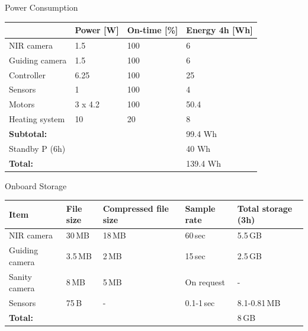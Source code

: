 \documentclass[11pt, aspectratio=169]{beamer}
\begin{document}
\begin{frame}{Power Consumption}
\centering
	\begin{tabular}{| l | l | l | l |}
	\hline
	& \textbf{Power [W]} & \textbf{On-time [\%]} & \textbf{Energy 4h [Wh]} \\\hline\hline
	NIR camera 		& 1.5	 	& 100 & 6 		\\\hline
	Guiding camera 	& 1.5 		& 100 & 6		\\\hline
	Controller 		& 6.25 		& 100 & 25		\\\hline
	Sensors 		& 1			& 100 & 4		\\\hline
	Motors			& 3 x 4.2	& 100 & 50.4	\\\hline
	Heating system 	& 10		& 20  & 8		\\\hline\hline
	
	\textbf{Subtotal:}& & 			  & 99.4 Wh \\\hline\hline
	
	Standby P (6h) 	& & 			  & 40 Wh	\\\hline\hline
	
	\textbf{Total:} & & 			  & 139.4 Wh\\\hline
	\end{tabular}
\end{frame}

\begin{frame}[c]{Onboard Storage}
\centering
\hspace*{-.5cm}
\begin{tabular}{| l | l | l | l | l |}
	\hline
	\textbf{Item} & \textbf{File size} & \textbf{Compressed file size} & \textbf{Sample rate} & \textbf{Total storage (3h)} \\\hline\hline
	
	NIR camera		& 30\,MB  & 18\,MB & 60\,sec 	 & 5.5\,GB \\\hline
	Guiding camera	& 3.5\,MB & 2\,MB  & 15\,sec	 & 2.5\,GB \\\hline
	Sanity camera	& 8\,MB   & 5\,MB  & On request  & - \\\hline
	Sensors			& 75\,B   & -      & 0.1-1\,sec  & 8.1-0.81\,MB \\\hline\hline
	\textbf{Total:} &	   	  &	       &	         & 8\,GB \\\hline
	

\end{tabular}
\end{frame}
\end{document}
